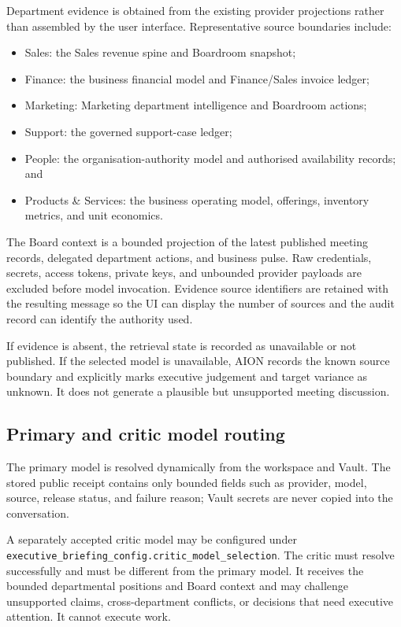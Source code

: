 Department evidence is obtained from the existing provider projections rather than assembled by
the user interface.  Representative source boundaries include:
\begin{itemize}[leftmargin=*]
\item Sales: the Sales revenue spine and Boardroom snapshot;
\item Finance: the business financial model and Finance/Sales invoice ledger;
\item Marketing: Marketing department intelligence and Boardroom actions;
\item Support: the governed support-case ledger;
\item People: the organisation-authority model and authorised availability records; and
\item Products \& Services: the business operating model, offerings, inventory metrics, and unit
      economics.
\end{itemize}

The Board context is a bounded projection of the latest published meeting records, delegated
department actions, and business pulse.  Raw credentials, secrets, access tokens, private keys,
and unbounded provider payloads are excluded before model invocation.  Evidence source identifiers
are retained with the resulting message so the UI can display the number of sources and the audit
record can identify the authority used.

If evidence is absent, the retrieval state is recorded as unavailable or not published.  If the
selected model is unavailable, AION records the known source boundary and explicitly marks
executive judgement and target variance as unknown.  It does not generate a plausible but
unsupported meeting discussion.

\subsection{Primary and critic model routing}

The primary model is resolved dynamically from the workspace and Vault.  The stored public receipt
contains only bounded fields such as provider, model, source, release status, and failure reason;
Vault secrets are never copied into the conversation.

A separately accepted critic model may be configured under
\texttt{executive\_briefing\_config.critic\_model\_selection}.  The critic must resolve successfully
and must be different from the primary model.  It receives the bounded departmental positions and
Board context and may challenge unsupported claims, cross-department conflicts, or decisions that
need executive attention.  It cannot execute work.

